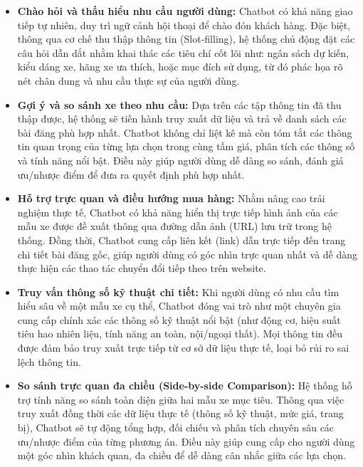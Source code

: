 \begin{itemize}
    \item \textbf{Chào hỏi và thấu hiểu nhu cầu người dùng:} Chatbot có khả năng giao tiếp tự nhiên, duy trì ngữ cảnh hội thoại để chào đón khách hàng. Đặc biệt, thông qua cơ chế thu thập thông tin (Slot-filling), hệ thống chủ động đặt các câu hỏi dẫn dắt nhằm khai thác các tiêu chí cốt lõi như: ngân sách dự kiến, kiểu dáng xe, hãng xe ưa thích, hoặc mục đích sử dụng, từ đó phác họa rõ nét chân dung và nhu cầu thực sự của người dùng.
    
    \item \textbf{Gợi ý và so sánh xe theo nhu cầu:} Dựa trên các tập thông tin đã thu thập được, hệ thống sẽ tiến hành truy xuất dữ liệu và trả về danh sách các bài đăng phù hợp nhất. Chatbot không chỉ liệt kê mà còn tóm tắt các thông tin quan trọng của từng lựa chọn trong cùng tầm giá, phân tích các thông số và tính năng nổi bật. Điều này giúp người dùng dễ dàng so sánh, đánh giá ưu/nhược điểm để đưa ra quyết định phù hợp nhất.

    \item \textbf{Hỗ trợ trực quan và điều hướng mua hàng:} Nhằm nâng cao trải nghiệm thực tế, Chatbot có khả năng hiển thị trực tiếp hình ảnh của các mẫu xe được đề xuất thông qua đường dẫn ảnh (URL) lưu trữ trong hệ thống. Đồng thời, Chatbot cung cấp liên kết (link) dẫn trực tiếp đến trang chi tiết bài đăng gốc, giúp người dùng có góc nhìn trực quan nhất và dễ dàng thực hiện các thao tác chuyển đổi tiếp theo trên website.
    
    \item \textbf{Truy vấn thông số kỹ thuật chi tiết:} Khi người dùng có nhu cầu tìm hiểu sâu về một mẫu xe cụ thể, Chatbot đóng vai trò như một chuyên gia cung cấp chính xác các thông số kỹ thuật nổi bật (như động cơ, hiệu suất tiêu hao nhiên liệu, tính năng an toàn, nội/ngoại thất). Mọi thông tin đều được đảm bảo truy xuất trực tiếp từ cơ sở dữ liệu thực tế, loại bỏ rủi ro sai lệch thông tin.
    
    \item \textbf{So sánh trực quan đa chiều (Side-by-side Comparison):} Hệ thống hỗ trợ tính năng so sánh toàn diện giữa hai mẫu xe mục tiêu. Thông qua việc truy xuất đồng thời các dữ liệu thực tế (thông số kỹ thuật, mức giá, trang bị), Chatbot sẽ tự động tổng hợp, đối chiếu và phân tích chuyên sâu các ưu/nhược điểm của từng phương án. Điều này giúp cung cấp cho người dùng một góc nhìn khách quan, đa chiều để dễ dàng cân nhắc giữa các lựa chọn.

\end{itemize}


